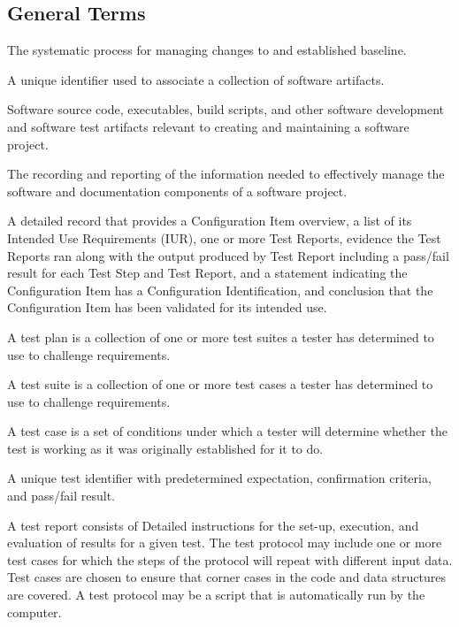 \subsection{General Terms}
\begin{description}[labelindent=25pt, style=multiline, leftmargin=7.0cm]

\item[Configuration Control]  The systematic process for managing changes
  to and established baseline.

\item[Configuration Identification]  A unique identifier used to associate
  a collection of software artifacts.

\item[Configuration Items]  Software source code, executables, build
  scripts, and other software development and software test artifacts relevant
  to creating and maintaining a software project.

\item[Configuration Status Accounting]  The recording and reporting of the
  information needed to effectively manage the software and documentation
  components of a software project.

\item[Report Package]  A detailed record that provides a Configuration
  Item overview, a list of its Intended Use Requirements (IUR), one or more Test
  Reports, evidence the Test Reports ran along with the output produced by
  Test Report including a pass/fail result for each Test Step and Test
  Report, and a statement indicating the Configuration Item has
  a Configuration Identification, and conclusion that the Configuration Item has
  been validated for its intended use.

\item[Test Plan]  A test plan is a collection of one or more test suites
  a tester has determined to use to challenge requirements.

\item[Test Suite]  A test suite is a collection of one or more test cases
  a tester has determined to use to challenge requirements.

\item[Test Case]  A test case is a set of conditions under which a tester
  will determine whether the test is working as it was originally established
  for it to do.

\item[Test Step]  A unique test identifier with predetermined expectation,
  confirmation criteria, and pass/fail result.

\item[Test Report]  A test report consists of Detailed instructions for
  the set-up, execution, and evaluation of results for a given test.  The test
  protocol may include one or more test cases for which the steps of the
  protocol will repeat with different input data. Test cases are chosen to
  ensure that corner cases in the code and data structures are covered. A test
  protocol may be a script that is automatically run by the computer.
\end{description}

